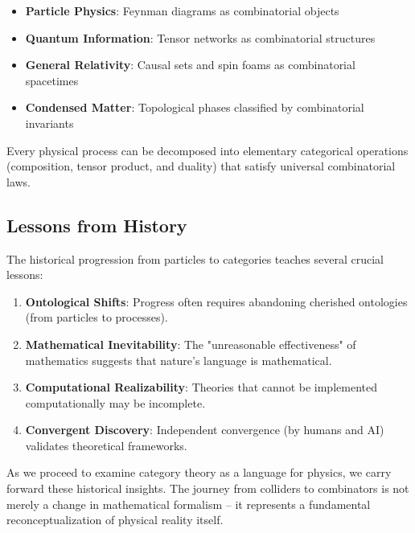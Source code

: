 \begin{itemize}[leftmargin=*]
\item \textbf{Particle Physics}: Feynman diagrams as combinatorial objects
\item \textbf{Quantum Information}: Tensor networks as combinatorial structures  
\item \textbf{General Relativity}: Causal sets and spin foams as combinatorial spacetimes
\item \textbf{Condensed Matter}: Topological phases classified by combinatorial invariants
\end{itemize}

\begin{theorem}
Every physical process can be decomposed into elementary categorical operations (composition, tensor product, and duality) that satisfy universal combinatorial laws.
\end{theorem}

\subsection{Lessons from History}

The historical progression from particles to categories teaches several crucial lessons:

\begin{enumerate}[leftmargin=*]
\item \textbf{Ontological Shifts}: Progress often requires abandoning cherished ontologies (from particles to processes).
\item \textbf{Mathematical Inevitability}: The "unreasonable effectiveness" of mathematics suggests that nature's language is mathematical.
\item \textbf{Computational Realizability}: Theories that cannot be implemented computationally may be incomplete.
\item \textbf{Convergent Discovery}: Independent convergence (by humans and AI) validates theoretical frameworks.
\end{enumerate}

As we proceed to examine category theory as a language for physics, we carry forward these historical insights. The journey from colliders to combinators is not merely a change in mathematical formalism -- it represents a fundamental reconceptualization of physical reality itself.